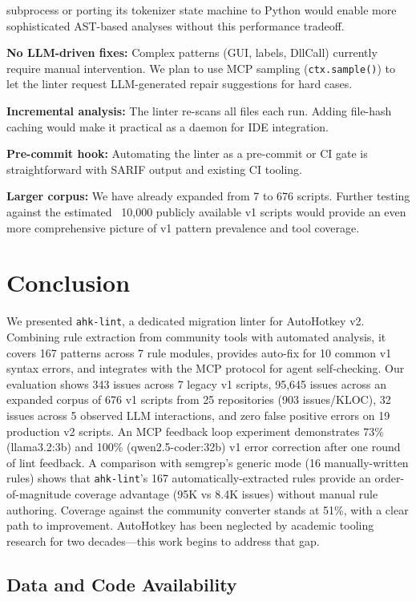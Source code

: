 \documentclass[11pt,a4paper]{article}
\begin{document}
subprocess or porting its tokenizer state machine to Python would enable more sophisticated AST-based analyses without this performance tradeoff.

\textbf{No LLM-driven fixes:} Complex patterns (GUI, labels, DllCall) currently require manual intervention. We plan to use MCP sampling (\texttt{ctx.sample()}) to let the linter request LLM-generated repair suggestions for hard cases.

\textbf{Incremental analysis:} The linter re-scans all files each run. Adding file-hash caching would make it practical as a daemon for IDE integration.

\textbf{Pre-commit hook:} Automating the linter as a pre-commit or CI gate is straightforward with SARIF output and existing CI tooling.

\textbf{Larger corpus:} We have already expanded from 7 to 676 scripts. Further testing against the estimated ~10,000 publicly available v1 scripts would provide an even more comprehensive picture of v1 pattern prevalence and tool coverage.

\section{Conclusion}

We presented \texttt{ahk-lint}, a dedicated migration linter for AutoHotkey v2. Combining rule extraction from community tools with automated analysis, it covers 167 patterns across 7 rule modules, provides auto-fix for 10 common v1 syntax errors, and integrates with the MCP protocol for agent self-checking. Our evaluation shows 343 issues across 7 legacy v1 scripts, 95,645 issues across an expanded corpus of 676 v1 scripts from 25 repositories (903 issues/KLOC), 32 issues across 5 observed LLM interactions, and zero false positive errors on 19 production v2 scripts. An MCP feedback loop experiment demonstrates 73\% (llama3.2:3b) and 100\% (qwen2.5-coder:32b) v1 error correction after one round of lint feedback. A comparison with semgrep's generic mode (16 manually-written rules) shows that \texttt{ahk-lint}'s 167 automatically-extracted rules provide an order-of-magnitude coverage advantage (95K vs 8.4K issues) without manual rule authoring. Coverage against the community converter stands at 51\%, with a clear path to improvement. AutoHotkey has been neglected by academic tooling research for two decades---this work begins to address that gap.

\subsection*{Data and Code Availability}
\end{document}
